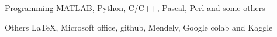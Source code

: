 

\begin{cvskills}

  \cvskill
    {Programming} %
    {MATLAB, Python, C/C++,  Pascal, Perl and some others} %


  \cvskill
    {Others} %
    {\LaTeX, Microsoft office, github, Mendely, Google colab and Kaggle}


\end{cvskills}
